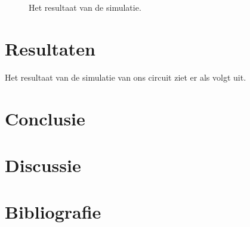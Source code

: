 \documentclass{scrartcl}  %
\begin{document}
\begin{figure}[H]
\centering
	\setlength{} 
	\setlength{}
	
	\caption{Het resultaat van de simulatie.}
	\label{fig:Id}
\end{figure}
\section{Resultaten}
Het resultaat van de simulatie van ons circuit ziet er als volgt uit.
\section{Conclusie}


\section{Discussie}


\newpage
{}
\section{Bibliografie}
\printbibliography
\end{document}
